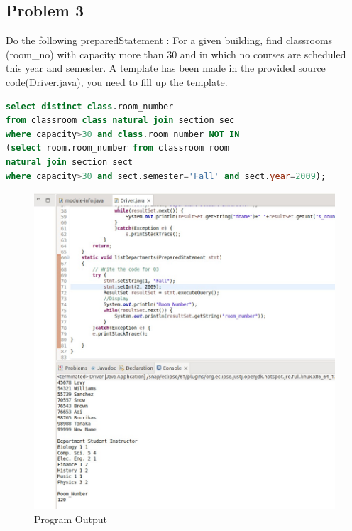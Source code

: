 \documentclass{article}
\begin{document}
\newpage
\subsection{Problem 3}
Do the following preparedStatement : For a given building, find classrooms (room\_no)
with capacity more than 30 and in which no courses are scheduled this year and semester.
A template has been made in the provided source code(Driver.java), you need to fill up
the template.
\begin{lstlisting}[language=sql]
select distinct class.room_number 
from classroom class natural join section sec 
where capacity>30 and class.room_number NOT IN 
(select room.room_number from classroom room 
natural join section sect 
where capacity>30 and sect.semester='Fall' and sect.year=2009);
\end{lstlisting}
\begin{figure}[!ht]
  \begin{center}
  \includegraphics[scale=0.5]{Part_A_3.jpg}
  \caption{Program Output}
  \end{center}
\end{figure}


\newpage
\end{document}
